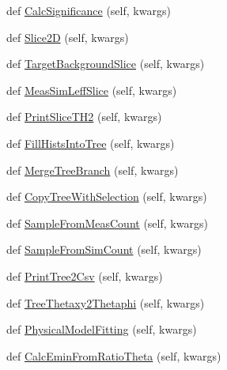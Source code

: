 \begin{DoxyCompactItemize}
\item 
def \hyperlink{classMIS_1_1DataFactory_1_1DataManager_1_1DataManager_afe428d8aee8eb6ff3efc595abb2dade8}{Calc\+Significance} (self, kwargs)
\item 
def \hyperlink{classMIS_1_1DataFactory_1_1DataManager_1_1DataManager_a1953691edc57314c60854a0cccaeb756}{Slice2D} (self, kwargs)
\item 
def \hyperlink{classMIS_1_1DataFactory_1_1DataManager_1_1DataManager_a6347b4c002b3f65e608161c33301c35d}{Target\+Background\+Slice} (self, kwargs)
\item 
def \hyperlink{classMIS_1_1DataFactory_1_1DataManager_1_1DataManager_a26dfe072c5d913b1f8bdd18492933c4c}{Meas\+Sim\+Leff\+Slice} (self, kwargs)
\item 
def \hyperlink{classMIS_1_1DataFactory_1_1DataManager_1_1DataManager_a5708bbc93bf8d48003f6da7996c23da8}{Print\+Slice\+T\+H2} (self, kwargs)
\item 
def \hyperlink{classMIS_1_1DataFactory_1_1DataManager_1_1DataManager_a9faf23cb74e7d6e098bc24978585f4f9}{Fill\+Hists\+Into\+Tree} (self, kwargs)
\item 
def \hyperlink{classMIS_1_1DataFactory_1_1DataManager_1_1DataManager_ade3befcd1a5f19793d8cca4d4dbb4b6d}{Merge\+Tree\+Branch} (self, kwargs)
\item 
def \hyperlink{classMIS_1_1DataFactory_1_1DataManager_1_1DataManager_aa2ef06b9e12ef08e654b55d2abd72bfe}{Copy\+Tree\+With\+Selection} (self, kwargs)
\item 
def \hyperlink{classMIS_1_1DataFactory_1_1DataManager_1_1DataManager_a45f092755ed9634998d923f10415d6d0}{Sample\+From\+Meas\+Count} (self, kwargs)
\item 
def \hyperlink{classMIS_1_1DataFactory_1_1DataManager_1_1DataManager_aa4aedaf37ee643b9a73a55b533b0ee44}{Sample\+From\+Sim\+Count} (self, kwargs)
\item 
def \hyperlink{classMIS_1_1DataFactory_1_1DataManager_1_1DataManager_a22ba1d4a77decbb0fdb6f2476c443308}{Print\+Tree2\+Csv} (self, kwargs)
\item 
def \hyperlink{classMIS_1_1DataFactory_1_1DataManager_1_1DataManager_a74abd8a0ce2581e3a3a1373e932ea1d0}{Tree\+Thetaxy2\+Thetaphi} (self, kwargs)
\item 
def \hyperlink{classMIS_1_1DataFactory_1_1DataManager_1_1DataManager_a8e36301ccbccbd084bbc29a129f23f26}{Physical\+Model\+Fitting} (self, kwargs)
\item 
def \hyperlink{classMIS_1_1DataFactory_1_1DataManager_1_1DataManager_a85a00abac51bac6984dd4c23aff884c9}{Calc\+Emin\+From\+Ratio\+Theta} (self, kwargs)

\end{DoxyCompactItemize}
